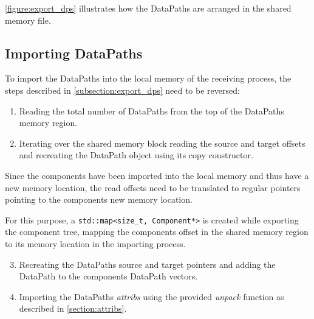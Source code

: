 \autoref{figure:export_dps} illustrates how the DataPaths are arranged in the shared memory file.

\subsection{Importing DataPaths}
To import the DataPaths into the local memory of the receiving process, the steps described in \autoref{subsection:export_dps} need to be reversed:

\begin{enumerate}
    \item Reading the total number of DataPaths from the top of the DataPaths memory region.
    \item Iterating over the shared memory block reading the source and target offsets and recreating the DataPath object using its copy constructor.
\end{enumerate}

Since the components have been imported into the local memory and thus have a new memory location, the read offsets need to be translated to regular pointers
pointing to the components new memory location.

For this purpose, a \lstinline|std::map<size_t, Component*>| is created while exporting the component tree, mapping the components offset in the shared memory region to its
memory location in the importing process.

\begin{enumerate}
    \setcounter{enumi}{2}
    \item Recreating the DataPaths source and target pointers and adding the DataPath to the components DataPath vectors.
    \item Importing the DataPaths \emph{attribs} using the provided \emph{unpack} function as described in \autoref{section:attribs}.
\end{enumerate}